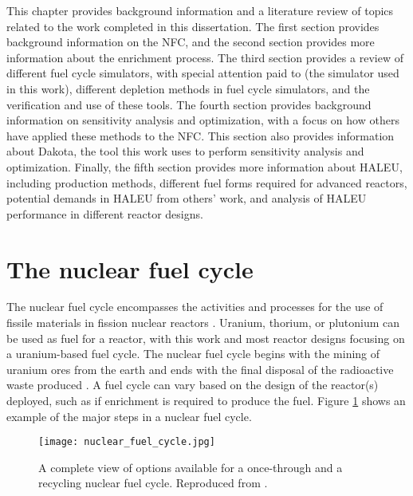 This chapter provides background information and a literature 
review of topics related to the work completed in this 
dissertation. The first section provides background information 
on the \acrfull{NFC}, and the second section provides more 
information about the 
enrichment process. The third section provides a 
review of different fuel cycle simulators, with special 
attention paid to \Cyclus (the simulator used in this work), 
different depletion methods in 
fuel cycle simulators, and the verification and use of 
these tools. The fourth section provides background information 
on sensitivity analysis and optimization, with a focus on 
how others have applied these methods to the \gls{NFC}. 
This section also provides information about Dakota, 
the tool this work uses to perform sensitivity analysis 
and optimization. Finally, the fifth section provides more 
information about \gls{HALEU}, including production methods, 
different fuel forms required for advanced reactors, potential 
demands in \gls{HALEU} from others' work, and analysis of 
\gls{HALEU} performance in different reactor designs. 
%
%
%
\section{The nuclear fuel cycle}
The nuclear fuel cycle encompasses the activities and processes 
for the use of fissile materials in fission nuclear reactors 
\cite{tsoulfanidis_nuclear_2013}. 
Uranium, thorium, or plutonium can be used as 
fuel for a reactor, with this work and most reactor designs focusing on 
a uranium-based 
fuel cycle. The nuclear fuel cycle begins with the mining of uranium ores 
from the earth and ends with the final disposal of the radioactive 
waste produced 
\cite{tsoulfanidis_nuclear_2013}. A fuel cycle can vary based on the
design of the reactor(s) deployed, such as if enrichment is required 
to produce the fuel.  
Figure \ref{fig:fuel_cycle} shows 
an example of the major steps in a nuclear fuel cycle. 

\begin{figure}
    \centering
    \texttt{[image: nuclear\_fuel\_cycle.jpg]}
    \caption{A complete view of options available for a once-through and 
    a recycling nuclear fuel cycle. Reproduced from 
    \protect\cite{us_nuclear_regulatory_commission_stages_2020}.}
    \label{fig:fuel_cycle}
\end{figure}

